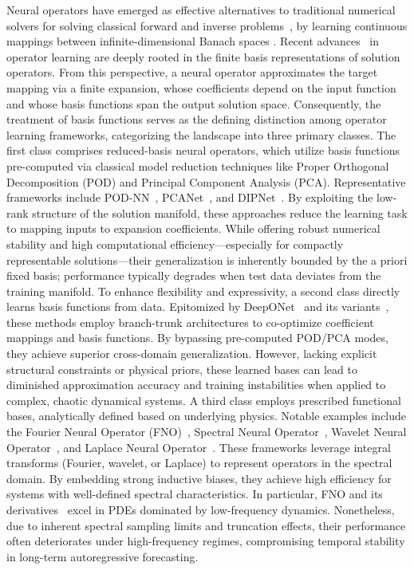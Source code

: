 \documentclass[preprint,numbers,sort&compress]{elsarticle}
\begin{document}
		
		Neural operators have emerged as effective alternatives to traditional numerical solvers for solving classical forward and inverse problems~\cite{NeuralInverse, li2024physics, liu2025difffno, cao2025diff, wang2025noise}, by learning continuous mappings between infinite-dimensional Banach spaces \cite{kovachki2023neural}. 
		Recent advances~\cite{liu2026deep} in operator learning are deeply rooted in the finite basis representations of solution operators. From this perspective, a neural operator approximates the target mapping via a finite expansion, whose coefficients depend on the input function and whose basis functions span the output solution space. Consequently, the treatment of basis functions serves as the defining distinction among operator learning frameworks, categorizing the landscape into three primary classes. The first class comprises reduced-basis neural operators, which utilize basis functions pre-computed via classical model reduction techniques like Proper Orthogonal Decomposition (POD) and Principal Component Analysis (PCA). Representative frameworks include POD-NN~\cite{hesthaven2018non}, PCANet~\cite{bhattacharya2021model}, and DIPNet~\cite{o2022derivative}. By exploiting the low-rank structure of the solution manifold, these approaches reduce the learning task to mapping inputs to expansion coefficients. While offering robust numerical stability and high computational efficiency—especially for compactly representable solutions—their generalization is inherently bounded by the a priori fixed basis; performance typically degrades when test data deviates from the training manifold. To enhance flexibility and expressivity, a second class directly learns basis functions from data. Epitomized by DeepONet~\cite{LuDeepOnet} and its variants~\cite{he2024geom, xu2023transfer, lu2022comprehensive}, these methods employ branch-trunk architectures to co-optimize coefficient mappings and basis functions. By bypassing pre-computed POD/PCA modes, they achieve superior cross-domain generalization. However, lacking explicit structural constraints or physical priors, these learned bases can lead to diminished approximation accuracy and training instabilities when applied to complex, chaotic dynamical systems. 
		A third class employs prescribed functional bases, analytically defined based on underlying physics. Notable examples include the Fourier Neural Operator (FNO)~\cite{li2020fourier}, Spectral Neural Operator~\cite{fanaskov2023spectral}, Wavelet Neural Operator~\cite{tripura2023wavelet}, and Laplace Neural Operator~\cite{cao2024laplace}. These frameworks leverage integral transforms (Fourier, wavelet, or Laplace) to represent operators in the spectral domain. By embedding strong inductive biases, they achieve high efficiency for systems with well-defined spectral characteristics. In particular, FNO and its derivatives~\cite{li2025d, lehmann20243d, rahman2022uno} excel in PDEs dominated by low-frequency dynamics. Nonetheless, due to inherent spectral sampling limits and truncation effects, their performance often deteriorates under high-frequency regimes, compromising temporal stability in long-term autoregressive forecasting.
		
\end{document}
